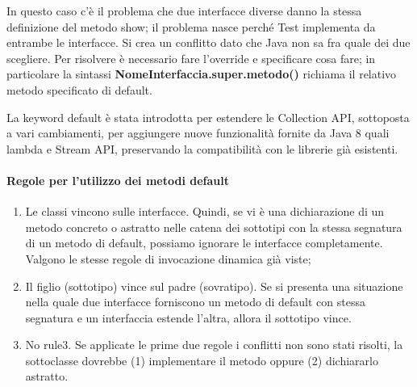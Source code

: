 In questo caso c'è il problema che due interfacce diverse danno la stessa definizione del metodo show; il problema nasce perché Test implementa da entrambe le interfacce. Si crea un conflitto dato che Java non sa fra quale dei due scegliere. Per risolvere è necessario fare l'override e specificare cosa fare; in particolare la sintassi \textbf{NomeInterfaccia.super.metodo()} richiama il relativo metodo specificato di default.

La keyword default è stata introdotta per estendere le Collection API, sottoposta a vari cambiamenti, per aggiungere nuove funzionalità fornite da Java 8 quali lambda e Stream API, preservando la compatibilità con le librerie già esistenti.
\paragraph{Regole per l'utilizzo dei metodi default}
\begin{enumerate}
	\item Le classi vincono sulle interfacce. Quindi, se vi è una dichiarazione di un metodo concreto o astratto nelle catena dei sottotipi con la stessa segnatura di un metodo di default, possiamo ignorare le interfacce completamente. Valgono le stesse regole di invocazione dinamica già viste;
	\item Il figlio (sottotipo) vince sul padre (sovratipo). Se si presenta una situazione nella quale due interfacce forniscono un metodo di default con stessa segnatura e un interfaccia estende l'altra, allora il sottotipo vince.
	\item No rule3. Se applicate le prime due regole i conflitti non sono stati risolti, la sottoclasse dovrebbe (1) implementare il metodo oppure (2) dichiararlo astratto.
	\end{enumerate}
